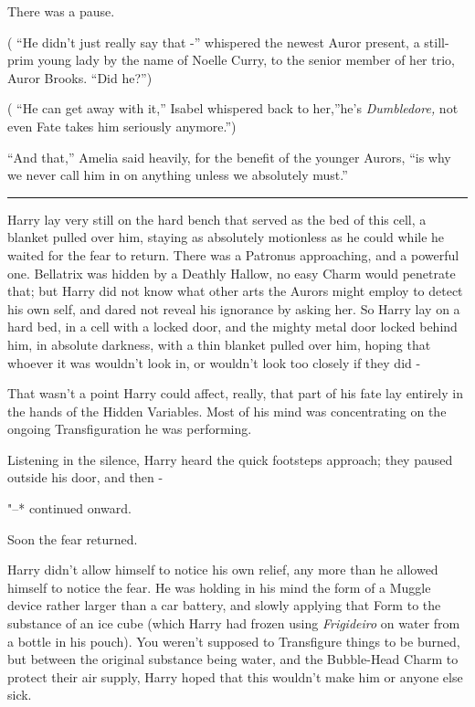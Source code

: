 There was a pause.

( ``He didn't just really say that -'' whispered the newest Auror
present, a still-prim young lady by the name of Noelle Curry, to the
senior member of her trio, Auror Brooks. ``Did he?'')

( ``He can get away with it,'' Isabel whispered back to her,''he's
\emph{Dumbledore,} not even Fate takes him seriously anymore.'')

``And that,'' Amelia said heavily, for the benefit of the younger
Aurors, ``is why we never call him in on anything unless we absolutely
must.''

\begin{center}\rule{3in}{0.4pt}\end{center}

Harry lay very still on the hard bench that served as the bed of this
cell, a blanket pulled over him, staying as absolutely motionless as he
could while he waited for the fear to return. There was a Patronus
approaching, and a powerful one. Bellatrix was hidden by a Deathly
Hallow, no easy Charm would penetrate that; but Harry did not know what
other arts the Aurors might employ to detect his own self, and dared not
reveal his ignorance by asking her. So Harry lay on a hard bed, in a
cell with a locked door, and the mighty metal door locked behind him, in
absolute darkness, with a thin blanket pulled over him, hoping that
whoever it was wouldn't look in, or wouldn't look too closely if they
did -

That wasn't a point Harry could affect, really, that part of his fate
lay entirely in the hands of the Hidden Variables. Most of his mind was
concentrating on the ongoing Transfiguration he was performing.

Listening in the silence, Harry heard the quick footsteps approach; they
paused outside his door, and then -

"--* continued onward.

Soon the fear returned.

Harry didn't allow himself to notice his own relief, any more than he
allowed himself to notice the fear. He was holding in his mind the form
of a Muggle device rather larger than a car battery, and slowly applying
that Form to the substance of an ice cube (which Harry had frozen using
\emph{Frigideiro} on water from a bottle in his pouch). You weren't
supposed to Transfigure things to be burned, but between the original
substance being water, and the Bubble-Head Charm to protect their air
supply, Harry hoped that this wouldn't make him or anyone else sick.

